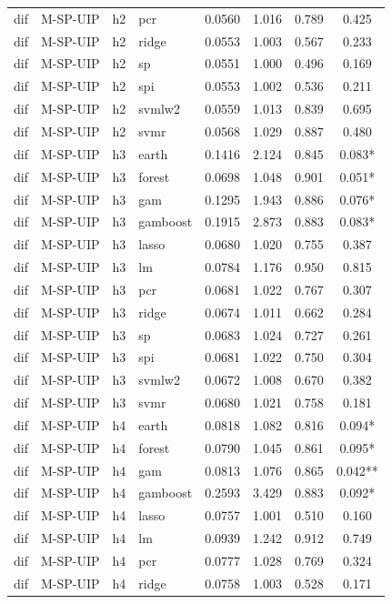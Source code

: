 \begin{ThreePartTable}
\begin{longtable}[t]{llclcccc}
dif & M-SP-UIP & h2 & pcr & 0.0560 & 1.016 & 0.789 & 0.425\\
dif & M-SP-UIP & h2 & ridge & 0.0553 & 1.003 & 0.567 & 0.233\\
dif & M-SP-UIP & h2 & sp & 0.0551 & 1.000 & 0.496 & 0.169\\
dif & M-SP-UIP & h2 & spi & 0.0553 & 1.002 & 0.536 & 0.211\\
dif & M-SP-UIP & h2 & svmlw2 & 0.0559 & 1.013 & 0.839 & 0.695\\
dif & M-SP-UIP & h2 & svmr & 0.0568 & 1.029 & 0.887 & 0.480\\
\addlinespace
dif & M-SP-UIP & h3 & earth & 0.1416 & 2.124 & 0.845 & 0.083*\\
dif & M-SP-UIP & h3 & forest & 0.0698 & 1.048 & 0.901 & 0.051*\\
dif & M-SP-UIP & h3 & gam & 0.1295 & 1.943 & 0.886 & 0.076*\\
dif & M-SP-UIP & h3 & gamboost & 0.1915 & 2.873 & 0.883 & 0.083*\\
dif & M-SP-UIP & h3 & lasso & 0.0680 & 1.020 & 0.755 & 0.387\\
dif & M-SP-UIP & h3 & lm & 0.0784 & 1.176 & 0.950 & 0.815\\
dif & M-SP-UIP & h3 & pcr & 0.0681 & 1.022 & 0.767 & 0.307\\
dif & M-SP-UIP & h3 & ridge & 0.0674 & 1.011 & 0.662 & 0.284\\
dif & M-SP-UIP & h3 & sp & 0.0683 & 1.024 & 0.727 & 0.261\\
dif & M-SP-UIP & h3 & spi & 0.0681 & 1.022 & 0.750 & 0.304\\
dif & M-SP-UIP & h3 & svmlw2 & 0.0672 & 1.008 & 0.670 & 0.382\\
dif & M-SP-UIP & h3 & svmr & 0.0680 & 1.021 & 0.758 & 0.181\\
\addlinespace
dif & M-SP-UIP & h4 & earth & 0.0818 & 1.082 & 0.816 & 0.094*\\
dif & M-SP-UIP & h4 & forest & 0.0790 & 1.045 & 0.861 & 0.095*\\
dif & M-SP-UIP & h4 & gam & 0.0813 & 1.076 & 0.865 & 0.042**\\
dif & M-SP-UIP & h4 & gamboost & 0.2593 & 3.429 & 0.883 & 0.092*\\
dif & M-SP-UIP & h4 & lasso & 0.0757 & 1.001 & 0.510 & 0.160\\
dif & M-SP-UIP & h4 & lm & 0.0939 & 1.242 & 0.912 & 0.749\\
dif & M-SP-UIP & h4 & pcr & 0.0777 & 1.028 & 0.769 & 0.324\\
dif & M-SP-UIP & h4 & ridge & 0.0758 & 1.003 & 0.528 & 0.171\\

\end{longtable}
\end{ThreePartTable}
